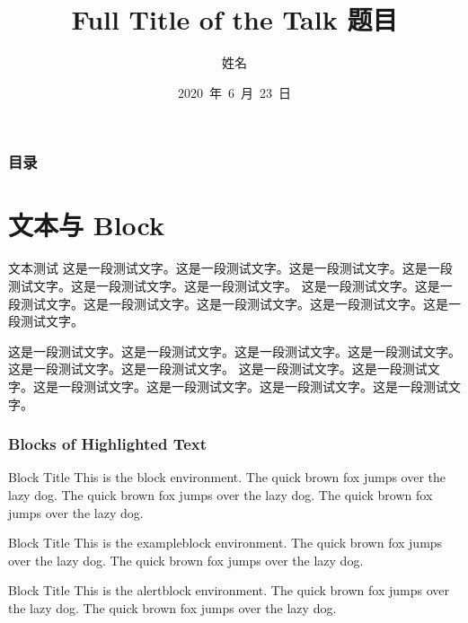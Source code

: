 \documentclass[notheorems]{beamer}
\title[Short 题目]{Full Title of the Talk 题目} %
\author{姓名}  %
\institute[NU] %
{
Name of University \\ %
\medskip
\textit{name@email.com} %
}
\date[2020.6.23]{2020~年~6~月~23~日} %
\theoremstyle{plain}
\numberwithin{theorem}{section}
\numberwithin{definition}{section}
\numberwithin{lemma}{section}
\numberwithin{proposition}{section}
\numberwithin{corollary}{section}
\theoremstyle{example}
\numberwithin{figure}{section}
\numberwithin{table}{section}
\numberwithin{equation}{section}
\begin{document}
\setlength{\baselineskip}{15pt}

{
\begin{frame}
\titlepage
\end{frame}}

\begin{frame}
\frametitle{目录}
\tableofcontents%
\end{frame}


\section{文本与 Block}

\begin{frame}{文本测试}
这是一段测试文字。这是一段测试文字。这是一段测试文字。这是一段测试文字。这是一段测试文字。这是一段测试文字。
这是一段测试文字。这是一段测试文字。这是一段测试文字。这是一段测试文字。这是一段测试文字。这是一段测试文字。

\vspace{1ex}
这是一段测试文字。这是一段测试文字。这是一段测试文字。这是一段测试文字。这是一段测试文字。这是一段测试文字。
这是一段测试文字。这是一段测试文字。这是一段测试文字。这是一段测试文字。这是一段测试文字。这是一段测试文字。

\end{frame}


\begin{frame}
\frametitle{Blocks of Highlighted Text}
\begin{block}{Block Title}
This is the block environment. The quick brown fox jumps over the lazy dog. The quick brown fox jumps over the lazy dog. The quick brown fox jumps over the lazy dog.
\end{block}

\begin{exampleblock}{Block Title}
This is the exampleblock environment. The quick brown fox jumps over the lazy dog. The quick brown fox jumps over the lazy dog.
\end{exampleblock}

\begin{alertblock}{Block Title}
This is the alertblock environment. The quick brown fox jumps over the lazy dog. The quick brown fox jumps over the lazy dog.
\end{alertblock}
\end{frame}
\end{document}
